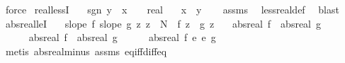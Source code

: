\begin{isabellebody}
\ force%
\endisatagproof
{\isafoldproof}%
%
\isadelimproof
\isanewline
%
\endisadelimproof
\isanewline
{}\isamarkupfalse%
\ real{\isacharunderscore}{\kern0pt}lessI{\isacharcolon}{\kern0pt}\isanewline
\ \ \ {\isachardoublequoteopen}sgn\ {\isacharparenleft}{\kern0pt}y\ {\isacharminus}{\kern0pt}\ x{\isacharparenright}{\kern0pt}\ {\isacharequal}{\kern0pt}\ {\isacharparenleft}{\kern0pt}{}\ {\isacharcolon}{\kern0pt}{\isacharcolon}{\kern0pt}\ real{\isacharparenright}{\kern0pt}{\isachardoublequoteclose}\isanewline
\ \ \ {\isachardoublequoteopen}x\ {\isacharless}{\kern0pt}\ y{\isachardoublequoteclose}\isanewline
%
\isadelimproof
\ \ %
\endisadelimproof
%
\isatagproof
{}\isamarkupfalse%
\ assms\ \isamarkupfalse%
\ less{\isacharunderscore}{\kern0pt}real{\isacharunderscore}{\kern0pt}def\ \isamarkupfalse%
\ blast%
\endisatagproof
{\isafoldproof}%
%
\isadelimproof
\isanewline
%
\endisadelimproof
\isanewline
{}\isamarkupfalse%
\ abs{\isacharunderscore}{\kern0pt}real{\isacharunderscore}{\kern0pt}leI{\isacharcolon}{\kern0pt}\isanewline
\ \ \ {\isachardoublequoteopen}slope\ f{\isachardoublequoteclose}\ {\isachardoublequoteopen}slope\ g{\isachardoublequoteclose}\ {\isachardoublequoteopen}{\isasymAnd}z{\isachardot}{\kern0pt}\ z\ {\isasymge}\ N\ {\isasymLongrightarrow}\ f\ z\ {\isasymge}\ g\ z{\isachardoublequoteclose}\isanewline
\ \ \ {\isachardoublequoteopen}abs{\isacharunderscore}{\kern0pt}real\ f\ {\isasymge}\ abs{\isacharunderscore}{\kern0pt}real\ g{\isachardoublequoteclose}\isanewline
%
\isadelimproof
%
\endisadelimproof
%
\isatagproof
{}\isamarkupfalse%
\ {\isacharminus}{\kern0pt}\isanewline
\ \ \isacommand{{\isacharbraceleft}{\kern0pt}}\isamarkupfalse%
\isanewline
\ \ \ \ \isamarkupfalse%
\ {\isachardoublequoteopen}abs{\isacharunderscore}{\kern0pt}real\ f\ {\isasymnoteq}\ abs{\isacharunderscore}{\kern0pt}real\ g{\isachardoublequoteclose}\isanewline
\ \ \ \ \isamarkupfalse%
\ {\isachardoublequoteopen}abs{\isacharunderscore}{\kern0pt}real\ {\isacharparenleft}{\kern0pt}f\ {\isacharplus}{\kern0pt}\isactrlsub e\ {\isacharminus}{\kern0pt}\isactrlsub e\ g{\isacharparenright}{\kern0pt}\ {\isasymnoteq}\ {}{\isachardoublequoteclose}\ \isamarkupfalse%
\ {\isacharparenleft}{\kern0pt}metis\ abs{\isacharunderscore}{\kern0pt}real{\isacharunderscore}{\kern0pt}minus\ assms{\isacharparenleft}{\kern0pt}{}{\isacharcomma}{\kern0pt}{}{\isacharparenright}{\kern0pt}\ eq{\isacharunderscore}{\kern0pt}iff{\isacharunderscore}{\kern0pt}diff{\isacharunderscore}{\kern0pt}eq{\isacharunderscore}{\kern0pt}{}{\isacharparenright}{\kern0pt}\isanewline

\end{isabellebody}
